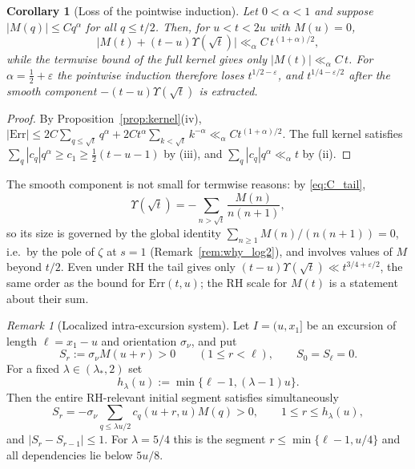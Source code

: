 \documentclass[11pt]{amsart}
\numberwithin{equation}{section}
\theoremstyle{plain}
\newtheorem{corollary}[theorem]{Corollary}
\theoremstyle{definition}
\theoremstyle{remark}
\newtheorem{remark}[theorem]{Remark}
\newcommand{\eps}{\varepsilon}
\begin{document}
\begin{corollary}[Loss of the pointwise induction]
\label{cor:induction-loss}
Let $0<\alpha<1$ and suppose $|M(q)|\le Cq^\alpha$ for all $q\le t/2$. Then,
for $u<t<2u$ with $M(u)=0$,
\begin{equation}
\label{eq:induction-loss}
\bigl|M(t)+(t-u)\Upsilon(\sqrt t)\bigr|\ll_\alpha C\,t^{(1+\alpha)/2},
\end{equation}
while the termwise bound of the full kernel gives only
$|M(t)|\ll_\alpha C\,t$. For $\alpha=\frac12+\eps$ the pointwise induction
therefore loses $t^{1/2-\eps}$, and $t^{1/4-\eps/2}$ after the smooth
component $-(t-u)\Upsilon(\sqrt t)$ is extracted.
\end{corollary}

\begin{proof}
By Proposition~\ref{prop:kernel}(iv),
$|\mathrm{Err}|\le2C\sum_{q\le\sqrt t}q^\alpha+2Ct^\alpha\sum_{k<\sqrt t}k^{-\alpha}
\ll_\alpha Ct^{(1+\alpha)/2}$. The full kernel satisfies
$\sum_q|c_q|q^\alpha\ge c_1\ge\frac12(t-u-1)$ by (iii), and
$\sum_q|c_q|q^\alpha\ll_\alpha t$ by (ii).
\end{proof}

The smooth component is not small for termwise reasons: by
\eqref{eq:C_tail},
\[
\Upsilon(\sqrt t)=-\sum_{n>\sqrt t}\frac{M(n)}{n(n+1)},
\]
so its size is governed by the global identity
$\sum_{n\ge1}M(n)/(n(n+1))=0$, i.e.\ by the pole of $\zeta$ at $s=1$
(Remark~\ref{rem:why_log2}), and involves values of $M$ beyond $t/2$. Even
under RH the tail gives only $(t-u)\Upsilon(\sqrt t)\ll t^{3/4+\eps/2}$, the
same order as the bound for $\mathrm{Err}(t,u)$; the RH scale for $M(t)$ is a statement
about their sum.

\begin{remark}[Localized intra-excursion system]
\label{rem:sign-cone}
Let $I=(u,x_1]$ be an excursion of length $\ell=x_1-u$ and orientation
$\sigma_\nu$, and put
\[
S_r:=\sigma_\nu M(u+r)>0\qquad(1\le r<\ell),\qquad S_0=S_\ell=0.
\]
For a fixed $\lambda\in(\lambda_*,2)$ set
\[
h_\lambda(u):=\min\{\ell-1,(\lambda-1)u\}.
\]
Then the entire RH-relevant initial segment satisfies simultaneously
\[
S_r=-\sigma_\nu\sum_{q\le\lambda u/2}c_q(u+r,u)M(q)>0,
\qquad1\le r\le h_\lambda(u),
\]
and $|S_r-S_{r-1}|\le1$.  For $\lambda=5/4$ this is the segment
$r\le\min\{\ell-1,u/4\}$ and all dependencies lie below $5u/8$.
\end{remark}
\end{document}
